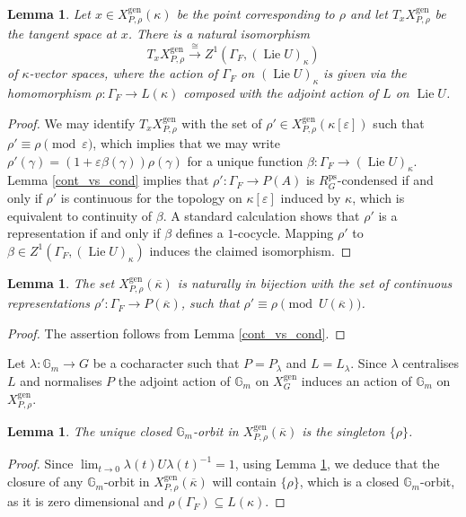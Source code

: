 \documentclass{amsart}
\newtheorem{lem}[prop]{Lemma}
\theoremstyle{definition}
\theoremstyle{remark}
\newcommand{\Gm}{\mathbb G_{m}}
\newcommand{\ps}{\mathrm{ps}}
\newcommand{\gen}{\mathrm{gen}}
\newcommand{\kappabar}{\overline{\kappa}}
\DeclareMathOperator{\Lie}{Lie}
\newcommand{\RpsG}{R^{\ps}_G}
\newcommand{\XgenG}{X^{\gen}_G}
\begin{document}
\begin{lem}\label{TxZ1} Let $x\in X^{\gen}_{P, \rho}(\kappa)$ be the point corresponding to $\rho$
and let $T_x X^{\gen}_{P, \rho}$ be the tangent space at $x$. There is a natural isomorphism
\begin{equation}\label{TxXPrho}
T_x X^{\gen}_{P, \rho}  \overset{\cong}{\longrightarrow} Z^1(\Gamma_F, (\Lie U)_{\kappa})
\end{equation}
of $\kappa$-vector spaces, where the action of $\Gamma_F$ on $(\Lie U)_{\kappa}$ is given via the homomorphism 
$\rho: \Gamma_F \rightarrow L(\kappa)$ composed with the adjoint action of $L$ on $\Lie U$. 
\end{lem}
\begin{proof} We may identify $T_x X^{\gen}_{P, \rho}$ with the set of 
$\rho'\in X^{\gen}_{P, \rho}(\kappa[\varepsilon])$ such that $\rho'\equiv \rho \pmod{\varepsilon}$, which implies that we may write $\rho'(\gamma)= (1 + \varepsilon \beta(\gamma)) \rho(\gamma)$ 
for a unique function $\beta: \Gamma_F \rightarrow (\Lie U)_{\kappa}$.
Lemma \ref{cont_vs_cond} implies that $\rho': \Gamma_F \rightarrow P(A)$ is 
$\RpsG$-condensed if and only if $\rho'$ is continuous for the topology on $\kappa[\varepsilon]$ induced
by $\kappa$, which is equivalent to continuity of $\beta$. A standard calculation shows that
$\rho'$ is a representation if and only if $\beta$ defines a $1$-cocycle. 
Mapping $\rho'$ to $\beta\in Z^1(\Gamma_F, (\Lie U)_{\kappa})$ induces the claimed isomorphism.
\end{proof}


\begin{lem}\label{Prho_geom_pts} The set $X^{\gen}_{P, \rho}(\kappabar)$ is naturally in bijection with the 
set of continuous representations $\rho':\Gamma_F \rightarrow P(\kappabar)$, such that 
$\rho' \equiv \rho \pmod{U(\kappabar)}$. 
\end{lem}

\begin{proof} The assertion follows from Lemma \ref{cont_vs_cond}.
\end{proof}

Let $\lambda: \Gm \rightarrow G$ be a cocharacter such that $P=P_{\lambda}$ and 
$L=L_{\lambda}$. Since $\lambda$ centralises $L$ and normalises $P$ the 
adjoint action of $\Gm$ on $\XgenG$ induces an action of $\Gm$ on $X^{\gen}_{P, \rho}$. 

\begin{lem}\label{clorbit_Prho} The unique closed $\Gm$-orbit in 
$X^{\gen}_{P, \rho}(\kappabar)$ is the singleton $\{\rho\}$.
\end{lem}
\begin{proof} Since $\lim_{t\rightarrow 0} \lambda(t) U \lambda(t)^{-1}= 1$, 
using Lemma \ref{Prho_geom_pts}, we deduce that the closure of any $\Gm$-orbit 
in $X^{\gen}_{P, \rho}(\kappabar)$ will contain $\{\rho\}$, which is a closed 
$\Gm$-orbit, as it is zero dimensional and $\rho(\Gamma_F)\subseteq L(\kappa)$. 
\end{proof} 
\end{document}
